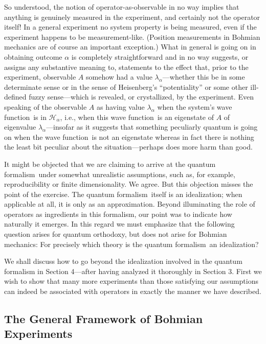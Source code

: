 \documentclass[12pt]{article}
\newcommand{\BM}{Bohmian mechanics}
\newcommand{\qf}{quantum formalism}
\newcommand{\wf}{wave function}
\renewcommand{\a}{\alpha}
\renewcommand{\H}{\mbox{$\mathcal{H}$}}
\begin{document}
So understood, the notion of operator-as-observable in no way implies
that anything is genuinely measured in the experiment, and certainly
not the operator itself!  In a general experiment no system property
is being measured, even if the experiment happens to be
measurement-like.  (Position measurements in \BM{} are of course an
important exception.)  What in general is going on in obtaining
outcome $\alpha$ is completely straightforward and in no way suggests,
or assigns any substantive meaning to, statements to the effect that,
prior to the experiment, observable $A$ somehow had a value
$\lambda_\a$---whether this be in some determinate sense or in the
sense of Heisenberg's ``potentiality'' or some other ill-defined fuzzy
sense---which is revealed, or crystallized, by the experiment.  Even
speaking of the observable $A$ as having value $\lambda_\a$ when the
system's \wf\ is in $\H_\a$, i.e., when this \wf\ is an eigenstate of
$A$ of eigenvalue $\lambda_\a$---insofar as it suggests that something
peculiarly quantum is going on when the \wf\ is not an eigenstate
whereas in fact there is nothing the least bit peculiar about the
situation---perhaps does more harm than good.


It might be objected that we are claiming to arrive at the \qf\ under
somewhat unrealistic assumptions, such as, for example,
reproducibility or finite dimensionality.  We agree.  But this
objection misses the point of the exercise.  The \qf\ itself is an
idealization; when applicable at all, it is only as an approximation.
Beyond illuminating the role of operators as ingredients in this
formalism, our point was to indicate how naturally it emerges.  In
this regard we must emphasize that the following question arises for
quantum orthodoxy, but does not arise for \BM: For precisely which
theory is the \qf\ an idealization?  \bigskip

We shall discuss how to go beyond the idealization involved in the
quantum formalism in Section 4---after having analyzed it thoroughly
in Section 3.  First we wish to show that many more experiments than
those satisfying our assumptions can indeed be associated with
operators in exactly the manner we have described.

\subsection{The General Framework of Bohmian Experiments}
\label{sec:E}\label{sec:GFE}
\end{document}
